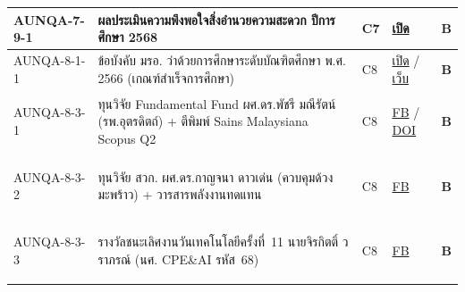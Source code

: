 \begin{longtable}{|>{\raggedright\arraybackslash}p{2.3cm}|>{\raggedright\arraybackslash}p{6.5cm}|>{\centering\arraybackslash}p{1.1cm}|>{\raggedright\arraybackslash}p{3.4cm}|>{\centering\arraybackslash}p{0.8cm}|}
  \hline
  \hypertarget{ref:AUNQA-7-9-1}{AUNQA-7-9-1} & ผลประเมินความพึงพอใจสิ่งอำนวยความสะดวก ปีการศึกษา 2568 & C7 & \href{https://syweb.kidcbc.work/Eviden_aunqa68/\%E0\%B8\%AB\%E0\%B8\%A5\%E0\%B8\%B1\%E0\%B8\%81\%E0\%B8\%90\%E0\%B8\%B2\%E0\%B8\%99\%E0\%B8\%81\%E0\%B8\%B2\%E0\%B8\%A3\%E0\%B8\%9B\%E0\%B8\%A3\%E0\%B8\%B0\%E0\%B8\%8A\%E0\%B8\%B8\%E0\%B8\%A1/01_\%E0\%B8\%A3\%E0\%B8\%B0\%E0\%B8\%94\%E0\%B8\%B1\%E0\%B8\%9A\%E0\%B8\%AB\%E0\%B8\%A5\%E0\%B8\%B1\%E0\%B8\%81\%E0\%B8\%AA\%E0\%B8\%B9\%E0\%B8\%95\%E0\%B8\%A3/\%E0\%B8\%81\%E0\%B8\%A1\%E0\%B8\%A8_2568-10-11_\%E0\%B8\%A3\%E0\%B8\%B1\%E0\%B8\%9A\%E0\%B8\%AA\%E0\%B8\%A1\%E0\%B8\%B1\%E0\%B8\%84\%E0\%B8\%A3\%E0\%B8\%99\%E0\%B8\%B1\%E0\%B8\%81\%E0\%B8\%A8\%E0\%B8\%B6\%E0\%B8\%81\%E0\%B8\%A9\%E0\%B8\%B2.pdf}{เปิด} & \textcolor{blue!70!black}{\textbf{B}} \\
  \hline
  \hypertarget{ref:AUNQA-8-1-1}{AUNQA-8-1-1} & ข้อบังคับ มรอ. ว่าด้วยการศึกษาระดับบัณฑิตศึกษา พ.ศ. 2566 (เกณฑ์สำเร็จการศึกษา) & C8 & \href{https://syweb.kidcbc.work/Eviden_aunqa68/\%E0\%B8\%A3\%E0\%B8\%B0\%E0\%B9\%80\%E0\%B8\%9A\%E0\%B8\%B5\%E0\%B8\%A2\%E0\%B8\%9A\%E0\%B8\%82\%E0\%B9\%89\%E0\%B8\%AD\%E0\%B8\%9A\%E0\%B8\%B1\%E0\%B8\%87\%E0\%B8\%84\%E0\%B8\%B1\%E0\%B8\%9A\%E0\%B9\%81\%E0\%B8\%A5\%E0\%B8\%B0\%E0\%B8\%9B\%E0\%B8\%A3\%E0\%B8\%B0\%E0\%B8\%81\%E0\%B8\%B2\%E0\%B8\%A8\%E0\%B8\%AD\%E0\%B8\%B7\%E0\%B9\%88\%E0\%B8\%99\%E0\%B9\%86/ref_\%E0\%B8\%82\%E0\%B9\%89\%E0\%B8\%AD\%E0\%B8\%9A\%E0\%B8\%B1\%E0\%B8\%87\%E0\%B8\%84\%E0\%B8\%B1\%E0\%B8\%9A\%E0\%B8\%AD\%E0\%B8\%99\%E0\%B8\%B8\%E0\%B8\%9B\%E0\%B8\%A3\%E0\%B8\%B4\%E0\%B8\%8D\%E0\%B8\%8D\%E0\%B8\%B2\%E0\%B8\%95\%E0\%B8\%A3\%E0\%B8\%B5_2566.pdf}{เปิด} / \href{https://academic.uru.ac.th/document/02898.pdf}{เว็บ} & \textcolor{blue!70!black}{\textbf{B}} \\
  \hline
  \hypertarget{ref:AUNQA-8-3-1}{AUNQA-8-3-1} & ทุนวิจัย Fundamental Fund ผศ.ดร.พัชรี มณีรัตน์ (รพ.อุตรดิตถ์) + ตีพิมพ์ Sains Malaysiana Scopus Q2 & C8 & \href{https://www.facebook.com/photo.php?fbid=1250341587222534}{FB} / \href{https://www.ukm.my/jsm/english_journals/vol55num2_2026/vol55num2_2026\%2014.html}{DOI} & \textcolor{blue!70!black}{\textbf{B}} \\
  \hline
  \hypertarget{ref:AUNQA-8-3-2}{AUNQA-8-3-2} & ทุนวิจัย สวก. ผศ.ดร.กาญจนา ดาวเด่น (ควบคุมด้วงมะพร้าว) + วารสารพลังงานทดแทน & C8 & \href{https://www.facebook.com/photo.php?fbid=1325067989651449}{FB} & \textcolor{blue!70!black}{\textbf{B}} \\
  \hline
  \hypertarget{ref:AUNQA-8-3-3}{AUNQA-8-3-3} & รางวัลชนะเลิศงานวันเทคโนโลยีครั้งที่~11 นายจิรกิตติ์ วราภรณ์ (นศ. CPE\&AI รหัส~68) & C8 & \href{https://www.facebook.com/photo.php?fbid=122160527912907878}{FB} & \textcolor{blue!70!black}{\textbf{B}} \\

\end{longtable}
